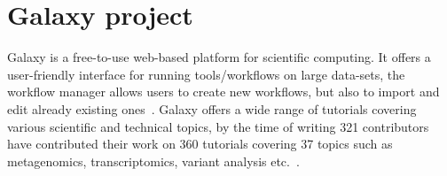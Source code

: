\section{Galaxy project}\label{sec:Galaxy-intro}
Galaxy is a free-to-use web-based platform for scientific computing. It offers a user-friendly interface for running tools/workflows on large data-sets, the workflow manager allows users to create new workflows, but also to import and edit already existing ones~\cite{the_galaxy_community_galaxy_2022}. Galaxy offers a wide range of tutorials covering various scientific and technical topics, by the time of writing 321 contributors have contributed their work on 360 tutorials covering 37 topics such as metagenomics, transcriptomics, variant analysis etc.~\cite{noauthor_galaxy_0000}.